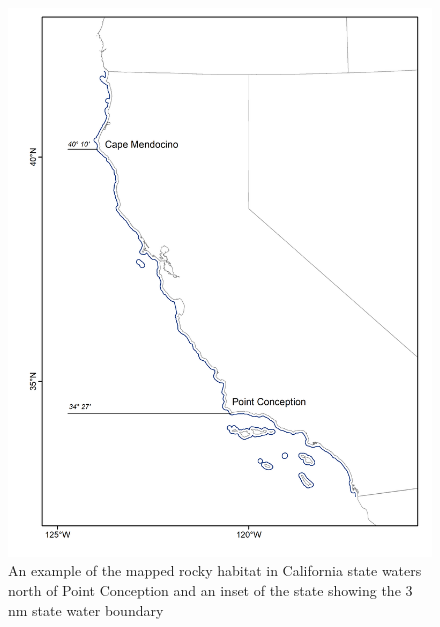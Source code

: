 \documentclass[
  authoryear,
  preprint,
  3p]{elsarticle}
\begin{document}
\begin{figure}

{\centering \includegraphics{figures/map.png}

}

\caption{\label{fig-map}An example of the mapped rocky habitat in
California state waters north of Point Conception and an inset of the
state showing the 3 nm state water boundary}

\end{figure}
\end{document}
